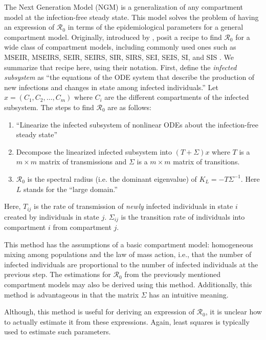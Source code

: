 \documentclass[12pt]{article}
\newcommand{\rr}{\ensuremath{\mathcal{R}_0}}
\begin{document}
The Next Generation Model (NGM) is a generalization of any compartment model at the infection-free steady state. This model solves the problem of having an expression of $\rr$ in terms of the epidemiological parameters for a general compartment model.  Originally, introduced by \citep{diekmann1990}, \cite{diekmann2009} posit a recipe to find $\rr$ for a wide class of compartment models, including commonly used ones such as MSEIR, MSEIRS, SEIR, SEIRS, SIR, SIRS, SEI, SEIS, SI, and SIS \citep{hethcote2000}. We summarize that recipe here, using their notation.  First, define the \textit{infected subsystem} as ``the equations of the ODE system that describe the production of new infections and changes in state among infected individuals.''  Let $x = (C_1, C_2, \dots, C_m)$ where $C_i$ are the different compartments of the infected subsystem.  The steps to find $\rr$ are as follows:


\begin{enumerate}
\item ``Linearize the infected subsystem of nonlinear ODEs about the infection-free steady state''
\item Decompose the linearized infected subsystem into $(T + \Sigma )x$ where $T$ is a $m\times m$ matrix of transmissions and $\Sigma$ is a $m \times m$ matrix of transitions.
\item $\rr$ is the spectral radius (i.e. the dominant eigenvalue) of $K_L=-T \Sigma^{-1}$.  Here $L$ stands for the ``large domain.''
\end{enumerate}

Here, $T_{ij}$ is the rate of transmission of \textit{newly} infected individuals in state $i$ created by individuals in state $j$.  $\Sigma_{ij}$ is the transition rate of individuals into compartment $i$ from compartment $j$.

This method has the assumptions of a basic compartment model: homogeneous mixing among populations and the law of mass action, i.e., that the number of infected individuals are proportional to the number of infected individuals at the previous step.  The estimations for $\rr$ from the previously mentioned compartment models may also be derived using this method.  Additionally, this method is advantageous in that the matrix $\Sigma$ has an intuitive meaning.

Although, this method is useful for deriving an expression of $\rr$, it is unclear how to actually estimate it from these expressions.  Again, least squares is typically used to estimate such parameters.
\end{document}
